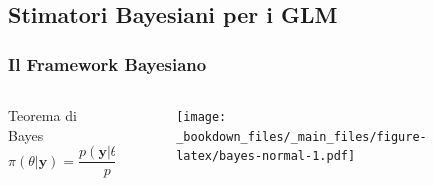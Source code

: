 \documentclass[pdf, aspectratio=169, xcolor=dvipsnames]{beamer}\usepackage[]{graphicx}\usepackage[]{color}
\theoremstyle{definition}
\begin{document}
\subsection{Stimatori Bayesiani per i GLM}

\begin{frame}
\frametitle{Il Framework Bayesiano}

\begin{columns}

\begin{column}{0.3\linewidth}
  \begin{block}{Teorema di Bayes}
  $$
  \pi(\theta|\boldsymbol{y}) = \frac{p(\boldsymbol{y}|\theta)\pi(\theta)}{p(\boldsymbol{y})}
  $$
  \end{block}
\end{column}

\begin{column}{0.7\linewidth}
  \begin{figure}
      \centering
      \texttt{[image: \_bookdown\_files/\_main\_files/figure-latex/bayes-normal-1.pdf]}
      \label{fig:bayes-normal}
    \end{figure}
\end{column}

\end{columns}


\end{frame}
\end{document}
